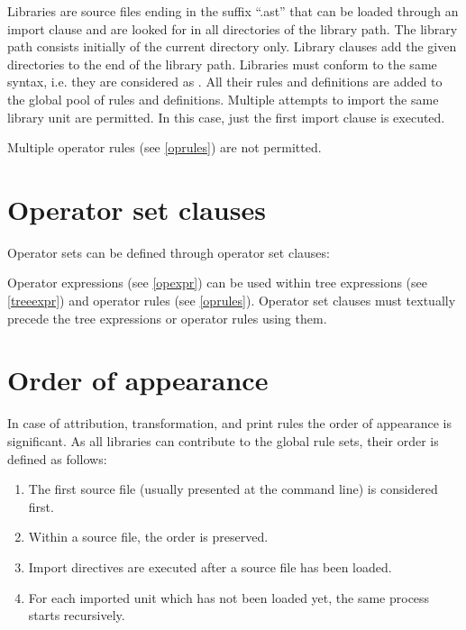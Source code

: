 Libraries are source files ending in the suffix ``.ast'' that can
be loaded through an import clause and are looked for in all
directories of the library path. The library path consists initially
of the current directory only. Library clauses add the given directories
to the end of the library path. Libraries must conform to the
same syntax, i.e. they are considered as . All their
rules and definitions are added to the global pool of rules and definitions.
Multiple attempts to import the same library unit are permitted. In this
case, just the first import clause is executed.

Multiple operator rules (see \ref{oprules}) are not permitted.

\section{Operator set clauses}\label{opset}

Operator sets can be defined through operator set clauses:

\begin{grammar}
      \produces {} 
	 \lextoken{=}  \lextoken{;}
\end{grammar}

\noindent
Operator expressions (see \ref{opexpr}) can be used within
tree expressions (see \ref{treeexpr}) and operator rules
(see \ref{oprules}). Operator set clauses must textually precede the
tree expressions or operator rules using them.

\section{Order of appearance}\label{order}

In case of attribution, transformation, and print rules the order
of appearance is significant. As all libraries can contribute to the
global rule sets, their order is defined as follows:

\begin{enumerate}
   \item The first source file (usually presented at the command line)
      is considered first.
   \item Within a source file, the order is preserved.
   \item Import directives are executed after a source file has been
      loaded.
   \item For each imported unit which has not been loaded yet, the
      same process starts recursively.
\end{enumerate}

